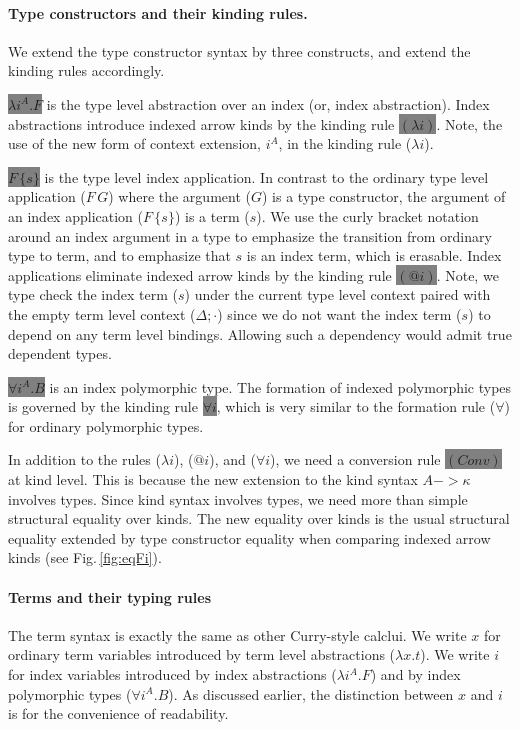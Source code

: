 \documentclass{llncs}
\newcommand{\Fig}[1]{Fig.\,\ref{fig:#1}}
\newcommand{\newFi}[1]{\colorbox{grey}{\ensuremath{#1}}}
\begin{document}
\paragraph{Type constructors and their kinding rules.}
We extend the type constructor syntax by three constructs,
and extend the kinding rules accordingly. %

\newFi{\lambda i^A.F} is the type level abstraction over an index
(or, index abstraction). Index abstractions introduce indexed arrow kinds
by the kinding rule \newFi{(\lambda i)}. Note, the use of the new form of context
extension, $i^A$, in the kinding rule ($\lambda i$).


\newFi{F\,\{s\}} is the type level index application. In contrast to
the ordinary type level application ($F\,G$) where the argument ($G$) is
a type constructor, the argument of an index application ($F\,\{s\}$) is
a term ($s$). We use the curly bracket notation around an index argument in a type to
emphasize the transition from ordinary type to term, and to emphasize
that $s$ is an index term, which is erasable. Index applications eliminate
indexed arrow kinds by the kinding rule \newFi{(@i)}. Note, we type check
the index term ($s$) under the current type level context paired with
the empty term level context ($\Delta;\cdot$) since we do not want
the index term ($s$) to depend on any term level bindings. Allowing such
a dependency would admit true dependent types.

\newFi{\forall i^A . B} is an index polymorphic type.
The formation of indexed polymorphic types is governed by
the kinding rule \newFi{\forall i}, which is very similar to
the formation rule ($\forall$) for ordinary polymorphic types.

In addition to the rules ($\lambda i$), ($@ i$), and ($\forall i$),
we need a conversion rule \newFi{(Conv)} at kind level. This is because
the new extension to the kind syntax $A -> \kappa$ involves types.
Since kind syntax involves types, we need more than simple structural
equality over kinds. The new equality over kinds is the usual structural equality
extended by type constructor equality when comparing indexed arrow kinds
(see \Fig{eqFi}).

\paragraph{Terms and their typing rules}
The term syntax is exactly the same as other Curry-style calclui.
We write $x$ for ordinary term variables introduced by
term level abstractions ($\lambda x.t$).
We write $i$ for index variables introduced by
index abstractions ($\lambda i^A.F$) and by
index polymorphic types ($\forall i^A.B$). As discussed earlier, the distinction between
$x$ and $i$ is for the convenience of readability.
\end{document}
